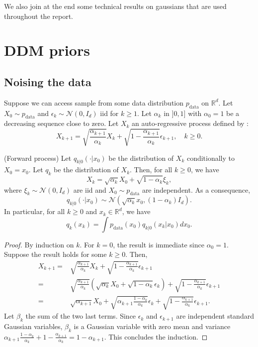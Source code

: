 \documentclass[12pt]{article}
\begin{document}
We also join at the end some technical results on gaussians that are used throughout the report.

\section{DDM priors}
\subsection{Noising the data}
Suppose we can access sample from some data distribution $p_{\text{data}}$ 
on $\mathbb{R}^d$.
Let $X_0 \sim p_{\text{data}}$ and $\epsilon_k \sim \mathcal{N}(0, I_d)$ 
iid for $k \geq 1$.
\newline
Let $\alpha_k$ in $]0, 1]$ with $\alpha_0 = 1$ be a decreasing sequence close to zero.
Let $X_k$ an auto-regressive process defined by :
$$X_{k+1} = \sqrt{\frac{\alpha_{k+1}}{\alpha_k}} X_k + 
\sqrt{1 - \frac{\alpha_{k+1}}{\alpha_k}} \epsilon_{k+1}, \quad k \geq 0.$$

\begin{assumption}(Forward process)
    Let $q_{k|0}( \cdot | x_0)$ be the distribution of $X_k$ conditionally to $X_0 = x_0$.
    Let $q_k$ be the distribution of $X_k$.
    Then, for all $k \geq 0$, we have 
    $$X_k = \sqrt{\alpha_k} X_0 + \sqrt{1 - \alpha_k} \xi_k,$$
    where $\xi_k \sim \mathcal{N}(0, I_d)$ are iid and $X_0 \sim p_{\text{data}}$ are independent.
    As a consequence,
    $$q_{k|0}(\cdot | x_0) \sim \mathcal{N}\left(\sqrt{\alpha_k} x_0, (1 - \alpha_k) I_d\right).$$
    In particular, for all $k \geq 0$ and $x_k \in \mathbb{R}^d$, we have
    $$q_k(x_k) =  \int p_{\text{data}}(x_0) q_{k|0}(x_k | x_0) dx_0.$$
\end{assumption}

\begin{proof}
   By induction on $k$.
   For $k = 0$, the result is immediate since $\alpha_0 = 1$.
   Suppose the result holds for some $k \geq 0$. Then, 
   \begin{align*}
    X_{k+1} = & \sqrt{\frac{\alpha_{k+1}}{\alpha_k}} X_k + 
    \sqrt{1 - \frac{\alpha_{k+1}}{\alpha_k}} \epsilon_{k+1} \\
    = & \sqrt{\frac{\alpha_{k+1}}{\alpha_k}} \left( \sqrt{\alpha_k} X_0 + \sqrt{1 - \alpha_k} \epsilon_k \right) + 
    \sqrt{1 - \frac{\alpha_{k+1}}{\alpha_k}} \epsilon_{k+1} \\
    = & \sqrt{\alpha_{k+1}} X_0 + \sqrt{\alpha_{k+1} \frac{1 - \alpha_k}{\alpha_k}} \epsilon_k + 
    \sqrt{1 - \frac{\alpha_{k+1}}{\alpha_k}}\epsilon_{k+1}.
   \end{align*}
   Let $\beta_k$ the sum of the two last terms.
   Since $\epsilon_k$ and $\epsilon_{k+1}$ are independent standard Gaussian variables,
   $\beta_k$ is a Gaussian variable with zero mean and variance $\alpha_{k+1} \frac{1 - \alpha_k}{\alpha_k} + 
   1 - \frac{\alpha_{k+1}}{\alpha_k} = 1 - \alpha_{k+1}$. This concludes the induction.
\end{proof}
\end{document}
